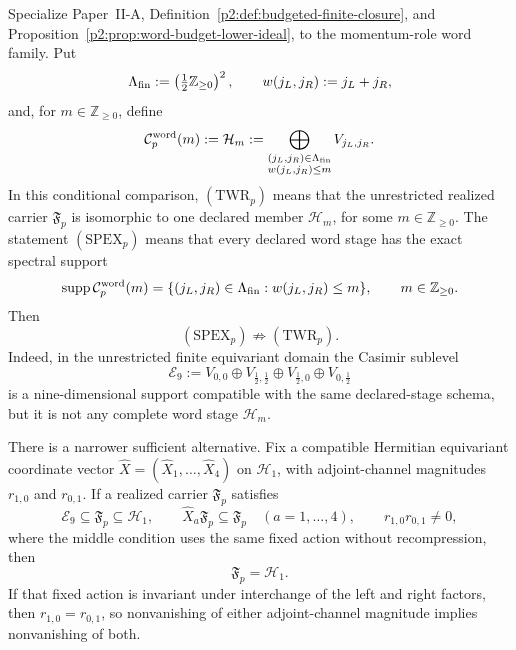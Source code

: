 \documentclass[11pt,a4paper]{article}
\begin{document}
\begin{proposition}
\label{p2e:prop:carrier-selection-boundary}
Specialize Paper~II-A,
Definition~\ref{p2:def:budgeted-finite-closure}, and
Proposition~\ref{p2:prop:word-budget-lower-ideal}, to the momentum-role word
family.  Put
\[
 \Lambda_{\rm fin}:=\left(\tfrac12\mathbb Z_{\ge0}\right)^2,
 \qquad
 w(j_L,j_R):=j_L+j_R,
\]
and, for \(m\in\mathbb Z_{\ge0}\), define
\[
 \mathcal C_p^{\rm word}(m)
 :=\mathcal H_m
 :=\bigoplus_{\substack{(j_L,j_R)\in\Lambda_{\rm fin}\\
                        w(j_L,j_R)\le m}}
        V_{j_L,j_R}.
\]
In this conditional comparison, \((\mathrm{TWR}_p)\) means that the unrestricted
realized carrier \(\mathfrak F_p\) is isomorphic to one declared member
\(\mathcal H_m\), for some \(m\in\mathbb Z_{\ge0}\).  The statement
\((\mathrm{SPEX}_p)\) means that every declared word stage has the exact
spectral support
\[
 \operatorname{supp}\mathcal C_p^{\rm word}(m)
 =\{(j_L,j_R)\in\Lambda_{\rm fin}:w(j_L,j_R)\le m\},
 \qquad m\in\mathbb Z_{\ge0}.
\]
Then
\[
        (\mathrm{SPEX}_p)\not\Longrightarrow(\mathrm{TWR}_p).
\]
Indeed, in the unrestricted finite equivariant domain the Casimir sublevel
\[
 \mathcal E_9
 :=V_{0,0}\oplus V_{\frac12,\frac12}
   \oplus V_{\frac12,0}\oplus V_{0,\frac12}
\]
is a nine-dimensional support compatible with the same declared-stage
schema, but it is not any complete word stage \(\mathcal H_m\).

There is a narrower sufficient alternative.  Fix a compatible Hermitian
equivariant coordinate vector
\(\widehat X=(\widehat X_1,\ldots,\widehat X_4)\) on \(\mathcal H_1\), with
adjoint-channel magnitudes \(r_{1,0}\) and \(r_{0,1}\).  If a realized
carrier \(\mathfrak F_p\) satisfies
\[
 \mathcal E_9\subseteq\mathfrak F_p\subseteq\mathcal H_1,
 \qquad
 \widehat X_a\mathfrak F_p\subseteq\mathfrak F_p
 \quad(a=1,\ldots,4),
 \qquad
 r_{1,0}r_{0,1}\ne0,
\]
where the middle condition uses the same fixed action without recompression,
then
\[
        \mathfrak F_p=\mathcal H_1.
\]
If that fixed action is invariant under interchange of the left and right
factors, then \(r_{1,0}=r_{0,1}\), so nonvanishing of either adjoint-channel
magnitude implies nonvanishing of both.
\end{proposition}
\end{document}
